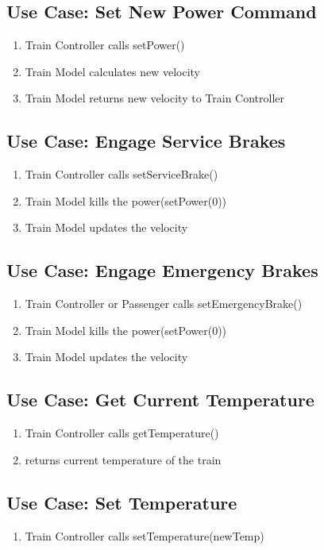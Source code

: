 \documentclass{scrreprt}
\begin{document}
\subsection{Use Case: Set New Power Command}
\begin{enumerate}
	\item Train Controller calls setPower()
  \item Train Model calculates new velocity
  \item Train Model returns new velocity to Train Controller

\end{enumerate}

\subsection{Use Case: Engage Service Brakes}
\begin{enumerate}
	\item Train Controller calls setServiceBrake()
  \item Train Model kills the power(setPower(0))
  \item Train Model updates the velocity

\end{enumerate}

\subsection{Use Case: Engage Emergency Brakes}
\begin{enumerate}
	\item Train Controller or Passenger calls setEmergencyBrake()
  \item Train Model kills the power(setPower(0))
  \item Train Model updates the velocity
\end{enumerate}

\subsection{Use Case: Get Current Temperature}
\begin{enumerate}
	\item Train Controller calls getTemperature()
	\item returns current temperature of the train
\end{enumerate}

\subsection{Use Case: Set Temperature}
\begin{enumerate}
	\item Train Controller calls setTemperature(newTemp)
\end{enumerate}
\end{document}
